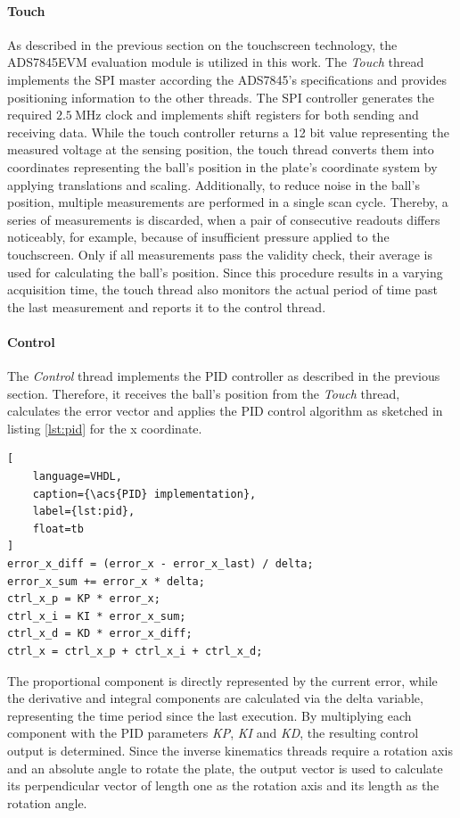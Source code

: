 \paragraph{Touch} As described in the previous section on the touchscreen
technology, the ADS7845EVM evaluation module is utilized in this work. The
\emph{Touch} thread implements the \ac{SPI} master according the ADS7845's
specifications and provides positioning information to the other threads. The
\ac{SPI} controller generates the required $\SI{2.5}{\mega\hertz}$ clock and
implements shift registers for both sending and receiving data. While the
touch controller returns a 12 bit value representing the measured voltage at
the sensing position, the touch thread converts them into coordinates
representing the ball's position in the plate's coordinate system by applying
translations and scaling. Additionally, to reduce noise in the ball's
position, multiple measurements are performed in a single scan cycle. Thereby,
a series of measurements is discarded, when a pair of consecutive readouts
differs noticeably, for example, because of insufficient pressure applied to
the touchscreen. Only if all measurements pass the validity check, their
average is used for calculating the ball's position. Since this procedure
results in a varying acquisition time, the touch thread also monitors the
actual period of time past the last measurement and reports it to the control
thread.

\paragraph{Control} The \emph{Control} thread implements the \ac{PID}
controller as described in the previous section. Therefore, it receives the
ball's position from the \emph{Touch} thread, calculates the error vector and
applies the \ac{PID} control algorithm as sketched in listing \ref{lst:pid}
for the x coordinate.
\begin{lstlisting}[
	language=VHDL,
	caption={\acs{PID} implementation},
	label={lst:pid},
	float=tb
]
error_x_diff = (error_x - error_x_last) / delta;
error_x_sum += error_x * delta;
ctrl_x_p = KP * error_x;
ctrl_x_i = KI * error_x_sum;
ctrl_x_d = KD * error_x_diff;
ctrl_x = ctrl_x_p + ctrl_x_i + ctrl_x_d;
\end{lstlisting}
The proportional component is directly represented by the current error, while
the derivative and integral components are calculated via the delta variable,
representing the time period since the last execution. By multiplying each
component with the \ac{PID} parameters \emph{KP}, \emph{KI} and \emph{KD}, the
resulting control output is determined. Since the inverse kinematics threads
require a rotation axis and an absolute angle to rotate the plate, the output
vector is used to calculate its perpendicular vector of length one as the
rotation axis and its length as the rotation angle.

